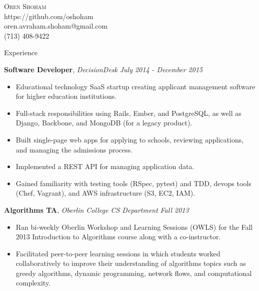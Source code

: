 \documentclass[9pt]{article}
\newenvironment{changemargin}[2]{%
  \begin{list}{}{%
    \setlength{\topsep}{0pt}%
    \setlength{\leftmargin}{#1}%
    \setlength{\rightmargin}{#2}%
    \setlength{\listparindent}{\parindent}%
    \setlength{\itemindent}{\parindent}%
    \setlength{\parsep}{\parskip}%
  }%
  \item[]}{\end{list}
}
\newcommand{\lineover}{
	\begin{changemargin}{-0.05in}{-0.05in}
		\vspace*{-8pt}
		\hrulefill \\
		\vspace*{-2pt}
	\end{changemargin}
}
\newcommand{\header}[1]{
	\begin{changemargin}{-0.5in}{-0.5in}
		\scshape{#1}\\
  	\lineover
	\end{changemargin}
}
\newcommand{\contact}[5]{
	\begin{changemargin}{-0.5in}{-0.5in}
		\begin{center}
			{\Large \scshape {#1}}\\ \smallskip
			{#2}\\ \smallskip 
			{#3}\\ \smallskip
			{#4}\smallskip
		\end{center}
	\end{changemargin}
}
\newenvironment{body} {
	\vspace*{-16pt}
	\begin{changemargin}{-0.25in}{-0.5in}
  }	
	{\end{changemargin}
}
\begin{document}

\contact{Oren Shoham}{https://github.com/oshoham}{oren.avraham.shoham@gmail.com}{(713) 408-9422}



\header{Experience}

\begin{body}
	\vspace{14pt}

	\textbf{Software Developer}, \emph{DecisionDesk} \hfill \emph{July 2014 - December 2015}\\
	\vspace*{-4pt}
	\begin{itemize} \itemsep -0pt  %
		\item Educational technology SaaS startup creating applicant management software for higher education institutions.
		\item Full-stack responsibilities using Rails, Ember, and PostgreSQL, as well as Django, Backbone, and MongoDB (for a legacy product).
		\item Built single-page web apps for applying to schools, reviewing applications, and managing the admissions process.
		\item Implemented a REST API for managing application data.
		\item Gained familiarity with testing tools (RSpec, pytest) and TDD, devops tools (Chef, Vagrant),  and AWS infrastructure (S3, EC2, IAM).
	\end{itemize}

	\textbf{Algorithms TA}, \emph{Oberlin College CS Department} \hfill \emph{Fall 2013}\\
	\vspace*{-4pt}
	\begin{itemize} \itemsep -0pt  %
		\item Ran bi-weekly Oberlin Workshop and Learning Sessions (OWLS) for the Fall 2013 Introduction to Algorithms course along with a co-instructor.
		\item Facilitated peer-to-peer learning sessions in which students worked collaboratively to improve their understanding of algorithms topics such as greedy algorithms, dynamic programming, network flows, and computational complexity.
	\end{itemize}


\end{body}
\end{document}
